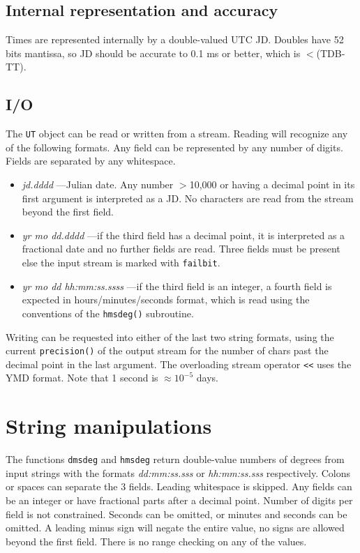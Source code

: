 \documentclass[11pt,preprint,flushrt]{aastex}
\begin{document}
\subsection{Internal representation and accuracy}
Times are represented internally by a double-valued UTC JD.  Doubles
 have 52 bits mantissa, so JD should be accurate to 0.1 ms or better, which is $<$(TDB-TT).

\subsection{I/O}
The \texttt{UT} object can be read or written from a stream.  Reading will recognize any of the following formats.  Any field can be represented by any number of digits.  Fields are separated by any whitespace.
\begin{itemize}
\item {\it jd.dddd} ---Julian date.  Any number $>$10,000 or having a decimal point in its first argument is interpreted as a JD.  No characters are read from the stream beyond the first field.
\item{\it yr mo dd.dddd} ---if the third field has a decimal point, it is interpreted as a fractional date and no further fields are read.  Three fields must be present else the input stream is marked with {\tt failbit}.
\item{\it yr mo dd hh:mm:ss.ssss} ---if the third field is an integer, a fourth field is expected in hours/minutes/seconds format, which is read using the conventions of the {\tt hmsdeg()} subroutine.
\end{itemize}
Writing can be requested into either of the last two string formats, using the current {\tt precision()} of the output stream for the number of chars past the decimal point in the last argument.  The overloading stream operator {\tt <<} uses the YMD format.  Note that 1 second is $\approx10^{-5}$ days.

\section{String manipulations}
The functions {\tt dmsdeg} and {\tt hmsdeg} return double-value numbers of degrees from input strings with the formats {\it dd:mm:ss.sss} or {\it hh:mm:ss.sss} respectively.  
Colons or spaces can separate the 3 fields.  Leading whitespace is skipped.  Any fields can be an integer or have fractional parts after a decimal point.  Number of digits per field is not constrained.  Seconds can be omitted, or minutes and seconds can be omitted.  A leading minus sign will negate the entire value, no signs are allowed beyond the first field.  There is no range checking on any of the values.
\end{document}
